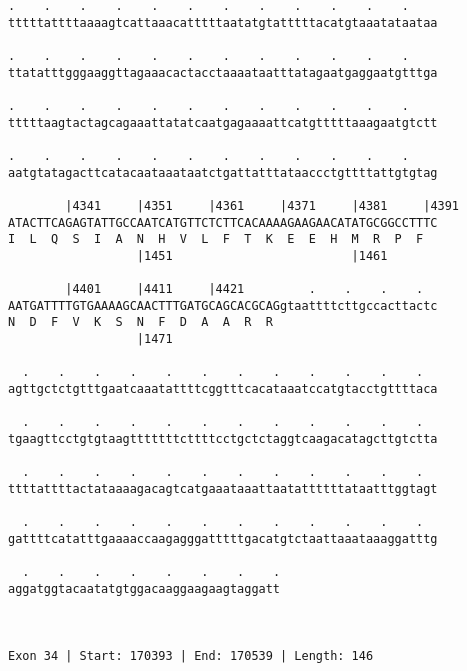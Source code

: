 \documentclass{article}
\begin{document}
\begin{Verbatim}
.    .    .    .    .    .    .    .    .    .    .    .    
tttttattttaaaagtcattaaacatttttaatatgtatttttacatgtaaatataataa
                                                            
.    .    .    .    .    .    .    .    .    .    .    .    
ttatatttgggaaggttagaaacactacctaaaataatttatagaatgaggaatgtttga
                                                            
.    .    .    .    .    .    .    .    .    .    .    .    
tttttaagtactagcagaaattatatcaatgagaaaattcatgtttttaaagaatgtctt
                                                            
.    .    .    .    .    .    .    .    .    .    .    .    
aatgtatagacttcatacaataaataatctgattatttataaccctgttttattgtgtag
                                                            
        |4341     |4351     |4361     |4371     |4381     |4391
ATACTTCAGAGTATTGCCAATCATGTTCTCTTCACAAAAGAAGAACATATGCGGCCTTTC
I  L  Q  S  I  A  N  H  V  L  F  T  K  E  E  H  M  R  P  F  
                  |1451                         |1461       
  
        |4401     |4411     |4421         .    .    .    .  
AATGATTTTGTGAAAAGCAACTTTGATGCAGCACGCAGgtaattttcttgccacttactc
N  D  F  V  K  S  N  F  D  A  A  R  R                       
                  |1471                                     
  
  .    .    .    .    .    .    .    .    .    .    .    .  
agttgctctgtttgaatcaaatattttcggtttcacataaatccatgtacctgttttaca
                                                            
  .    .    .    .    .    .    .    .    .    .    .    .  
tgaagttcctgtgtaagtttttttcttttcctgctctaggtcaagacatagcttgtctta
                                                            
  .    .    .    .    .    .    .    .    .    .    .    .  
ttttattttactataaaagacagtcatgaaataaattaatattttttataatttggtagt
                                                            
  .    .    .    .    .    .    .    .    .    .    .    .  
gattttcatatttgaaaaccaagagggatttttgacatgtctaattaaataaaggatttg
                                                            
  .    .    .    .    .    .    .    .
aggatggtacaatatgtggacaaggaagaagtaggatt
                                      
                                      
 
Exon 34 | Start: 170393 | End: 170539 | Length: 146




\end{Verbatim}
\end{document}
